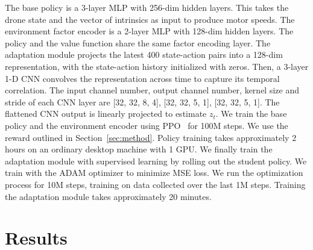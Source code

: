  The base policy is a 3-layer MLP with 256-dim hidden layers. This takes the drone state and the vector of intrinsics as input to produce motor speeds. The environment factor encoder is a 2-layer MLP with 128-dim hidden layers.  The policy and the value function share the same factor encoding layer. The adaptation module projects the latest 400 state-action pairs into a 128-dim representation, with the state-action history initialized with zeros. Then, a 3-layer 1-D CNN convolves the representation across time to capture its temporal correlation. The input channel number, output channel number, kernel size and stride of each CNN layer are [32, 32, 8, 4], [32, 32, 5, 1], [32, 32, 5, 1]. The flattened CNN output is linearly projected to estimate $z_t$. We train the base policy and the environment encoder using PPO~\cite{schulman2017proximal} for 100M steps. We use the reward outlined in Section~\ref{sec:method}. Policy training takes approximately 2 hours on an ordinary desktop machine with 1 GPU.
%
We finally train the adaptation module with supervised learning by rolling out the student policy. We train with the ADAM optimizer to minimize MSE loss. 
%
We run the optimization process for 10M steps, training on data collected over the last 1M steps. Training the adaptation module takes approximately 20 minutes.



\section{Results}





